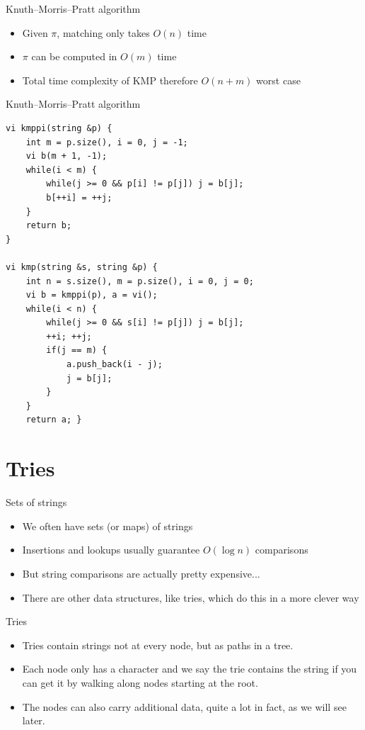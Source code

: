 \documentclass{beamer}
\begin{document}
	\begin{frame}[plain]{Knuth--Morris--Pratt algorithm}
		\begin{itemize}
			\item Given $\pi$, matching only takes $O(n)$ time
			\item $\pi$ can be computed in $O(m)$ time
			\item Total time complexity of KMP therefore $O(n+m)$ worst case
		\end{itemize}
	\end{frame}
	
	\begin{frame}{Knuth--Morris--Pratt algorithm}
		\begin{verbatim}
vi kmppi(string &p) {
	int m = p.size(), i = 0, j = -1; 
	vi b(m + 1, -1);
	while(i < m) { 
		while(j >= 0 && p[i] != p[j]) j = b[j]; 
		b[++i] = ++j; 
	} 
	return b; 
}

vi kmp(string &s, string &p) {
	int n = s.size(), m = p.size(), i = 0, j = 0;
	vi b = kmppi(p), a = vi(); 
	while(i < n) {
		while(j >= 0 && s[i] != p[j]) j = b[j];
		++i; ++j; 
		if(j == m) { 
			a.push_back(i - j);
			j = b[j]; 
		} 
	} 
	return a; }
		\end{verbatim}
	\end{frame}
	
	\section*{Tries}
	
	\begin{frame}[plain]{Sets of strings}
		\begin{itemize}
			\item We often have sets (or maps) of strings
			\item Insertions and lookups usually guarantee $O(\log n)$ comparisons
			\vspace{10pt}
			\item But string comparisons are actually pretty expensive...
			\vspace{10pt}
			\item There are other data structures, like tries, which do this in a more clever way
		\end{itemize}
	\end{frame}
	
	\begin{frame}[plain]{Tries}
		\begin{itemize}
			\item Tries contain strings not at every node, but as paths in a tree.
			\item Each node only has a character and we say the trie contains the string if you can get it by walking along nodes starting at the root.
			\item The nodes can also carry additional data, quite a lot in fact, as we will see later.
		\end{itemize}
	\end{frame}
	
\end{document}
